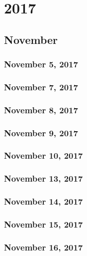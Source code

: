 \part{2017}
\chapter{November}
\section{November 5, 2017}


\section{November 7, 2017}



\section{November 8, 2017}



\section{November 9, 2017}



\section{November 10, 2017}

\section{November 13, 2017}


\section{November 14, 2017}

\section{November 15, 2017}


\section{November 16, 2017}


